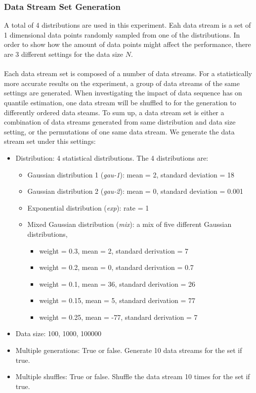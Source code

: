 \subsubsection{Data Stream Set Generation}
A total of 4 distributions are used in this experiment.
Eah data stream is a set of 1 dimensional data points randomly sampled from one of the distributions. In order to show how the amount of data points might affect the performance, there are 3 different settings for the data size $N$. 
\\\\
Each data stream set is composed of a number of data streams. For a statistically more accurate results on the experiment, a group of data streams of the same settings are generated. When investigating the impact of data sequence has on quantile estimation, one data stream will be shuffled to for the generation to differently ordered data steams. To sum up, a data stream set is either a combination of data streams generated from same distribution and data size setting, or the permutations of one same data stream. We generate the data stream set under this settings:

\begin{itemize}
    \item Distribution: 4 statistical distributions. The 4 distributions are:
        \begin{itemize}
            \item Gaussian distribution 1 (\textit{gau-1}): mean = 2, standard deviation = 18
            \item Gaussian distribution 2 (\textit{gau-2}): mean = 0, standard deviation = 0.001
            \item Exponential distribution (\textit{exp}): rate = 1
            \item Mixed Gaussian distribution (\textit{mix}): a mix of five different Gaussian distributions, 
            \begin{itemize}
                \item weight = 0.3, mean = 2, standard derivation = 7
                \item weight = 0.2, mean = 0, standard derivation = 0.7
                \item weight = 0.1, mean = 36, standard derivation = 26
                \item weight = 0.15, mean = 5, standard derivation = 77
                \item weight = 0.25, mean = -77, standard derivation = 7
            \end{itemize}
        \end{itemize}
    \item Data size: 100, 1000, 100000
    \item Multiple generations: True or false. Generate 10 data streams for the set if true.
    \item Multiple shuffles:  True or false. Shuffle the data stream 10 times for the set if true.
\end{itemize}


